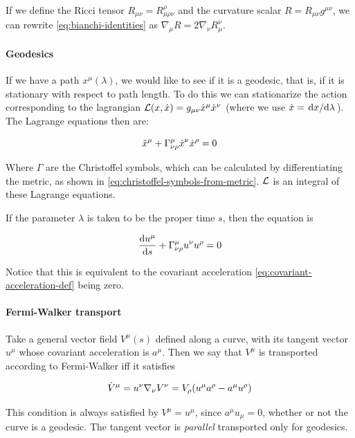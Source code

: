 \documentclass[main.tex]{subfiles}
\begin{document}
If we define the Ricci tensor \(R_{\mu\nu} = R^\rho_{\mu \rho \nu}\) and the curvature scalar \(R = R_{\mu\nu}g^{\mu\nu}\), we can rewrite \eqref{eq:bianchi-identities}  as \(\nabla_\mu R = 2 \nabla_\nu R^{\nu}_{\mu}\).

\paragraph{Geodesics}

If we have a path $x^\mu(\lambda)$, we would like to see if it is a geodesic, that is, if it is stationary with respect to path length. To do this we can stationarize the action corresponding to the lagrangian $\mathcal{L} (x, \Dot{x}) = g_{\mu\nu} \Dot{x}^\mu \Dot{x}^\nu$ (where we use $\Dot{x} = \dv*{x}{\lambda}$). The Lagrange equations then are:

\begin{equation}
    \Ddot{x}^\mu + \Gamma^\mu_{\nu\rho} \Dot{x}^\nu \Dot{x}^\rho = 0
\end{equation}

Where $\Gamma$ are the Christoffel symbols, which can be calculated by differentiating the metric, as shown in \eqref{eq:christoffel-symbols-from-metric}. $\mathcal{L}$ is an integral of these Lagrange equations.

If the parameter $\lambda$ is taken to be the proper time $s$, then the equation is

\begin{equation}
    \dv{u^\mu}{s} + \Gamma^\mu _{\nu\rho} u^\nu u^\rho = 0
\end{equation}

Notice that this is equivalent to the covariant acceleration \eqref{eq:covariant-acceleration-def} being zero.

\paragraph{Fermi-Walker transport}

Take a general vector field \(V ^{\mu} (s)\) defined along a curve, with its tangent vector \(u^\mu\) whose covariant acceleration is \(a^\mu\).
Then we say that \(V^\mu\) is transported according to Fermi-Walker iff it satisfies

\begin{equation}
    \dot{V}^\mu  = u^\nu \nabla_\nu V^\nu
    = V_\rho \qty(u^\mu a^\rho - a^\mu u^\rho)
\end{equation}

This condition is always satisfied by \(V^\mu = u^\mu\), since \(a^\mu u_\mu = 0\), whether or not the curve is a geodesic. The tangent vector is \emph{parallel} transported only for geodesics.
\end{document}
